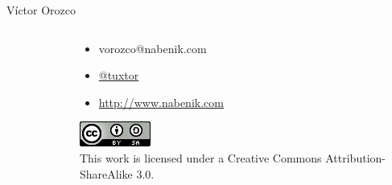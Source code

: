 \documentclass{beamer}
\begin{document}
\begin{frame}{Víctor Orozco}
\begin{columns}[T]
\begin{column}[T]{4cm}
\begin{figure}
		\end{figure}
	\end{column}
	\begin{column}[T]{6cm} %
		\begin{itemize}
			\item vorozco@nabenik.com
			\item \href{https://twitter.com/tuxtor}{@tuxtor}
			\item \href{http://www.nabenik.com}{http://www.nabenik.com}
		\end{itemize}
	\begin{center}
		\includegraphics[width=0.1\linewidth]{Images/cclogo}
		\\
		This work is licensed under a Creative Commons Attribution-ShareAlike 3.0.
	\end{center}
	\end{column}
\end{columns}
\end{frame}
\end{document}
